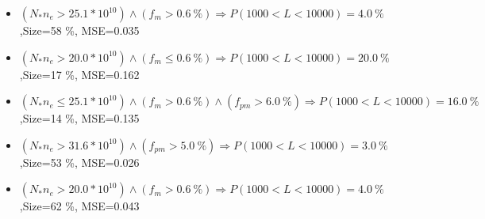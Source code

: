 \documentclass[numbered]{CSL}
\begin{document}
\begin{itemize}
\item $(N_* n_e > 25.1 * 10^{10}) \land (f_m > 0.6~\%) \Rightarrow P(1 000 < L < 10 000) = 4.0~\%$,\hfill Size=58 \%, MSE=0.035
\item $(N_* n_e > 20.0 * 10^{10}) \land (f_m \leq 0.6~\%) \Rightarrow P(1 000 < L < 10 000) = 20.0~\%$,\hfill Size=17 \%, MSE=0.162
\item $(N_* n_e \leq 25.1 * 10^{10}) \land (f_m > 0.6~\%) \land (f_{pm} > 6.0~\%) \Rightarrow P(1 000 < L < 10 000) = 16.0~\%$,\hfill Size=14 \%, MSE=0.135
\item $(N_* n_e > 31.6 * 10^{10}) \land (f_{pm} > 5.0~\%) \Rightarrow P(1 000 < L < 10 000) = 3.0~\%$,\hfill Size=53 \%, MSE=0.026
\item $(N_* n_e > 20.0 * 10^{10}) \land (f_m > 0.6~\%) \Rightarrow P(1 000 < L < 10 000) = 4.0~\%$,\hfill Size=62 \%, MSE=0.043
\end{itemize}
\end{document}
